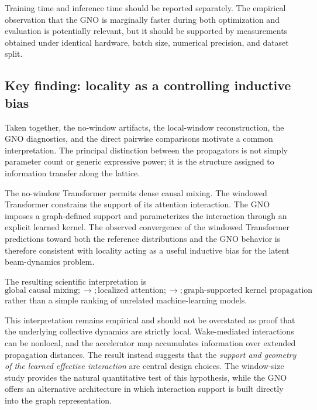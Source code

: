 \documentclass[11pt,a4paper]{article}
\begin{document}
\begin{sloppypar}
Training time and inference time should be reported separately. The empirical observation that the GNO is marginally faster during both optimization and evaluation is potentially relevant, but it should be supported by measurements obtained under identical hardware, batch size, numerical precision, and dataset split.

\subsection{Key finding: locality as a controlling inductive bias}
\label{subsec:key_finding_locality}

Taken together, the no-window artifacts, the local-window reconstruction, the GNO diagnostics, and the direct pairwise comparisons motivate a common interpretation. The principal distinction between the propagators is not simply parameter count or generic expressive power; it is the structure assigned to information transfer along the lattice.

The no-window Transformer permits dense causal mixing. The windowed Transformer constrains the support of its attention interaction. The GNO imposes a graph-defined support and parameterizes the interaction through an explicit learned kernel. The observed convergence of the windowed Transformer predictions toward both the reference distributions and the GNO behavior is therefore consistent with locality acting as a useful inductive bias for the latent beam-dynamics problem.

The resulting scientific interpretation is
\begin{equation}
\boxed{
\text{global causal mixing}
;\longrightarrow;
\text{localized attention}
;\longrightarrow;
\text{graph-supported kernel propagation}
}
\label{eq:locality_synthesis_results}
\end{equation}
rather than a simple ranking of unrelated machine-learning models.

This interpretation remains empirical and should not be overstated as proof that the underlying collective dynamics are strictly local. Wake-mediated interactions can be nonlocal, and the accelerator map accumulates information over extended propagation distances. The result instead suggests that the \emph{support and geometry of the learned effective interaction} are central design choices. The window-size study provides the natural quantitative test of this hypothesis, while the GNO offers an alternative architecture in which interaction support is built directly into the graph representation.



\end{sloppypar}
\end{document}

